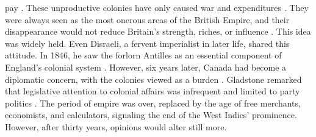 pay . These unproductive colonies have only caused war and expenditures . They were always seen as the most onerous areas of the British Empire, and their disappearance would not reduce Britain's strength, riches, or influence . This idea was widely held. Even Disraeli, a fervent imperialist in later life, shared this attitude. In 1846, he saw the forlorn Antilles as an essential component of England's colonial system . However, six years later, Canada had become a diplomatic concern, with the colonies viewed as a burden . Gladstone remarked that legislative attention to colonial affairs was infrequent and limited to party politics . The period of empire was over, replaced by the age of free merchants, economists, and calculators, signaling the end of the West Indies' prominence. However, after thirty years, opinions would alter still more.
